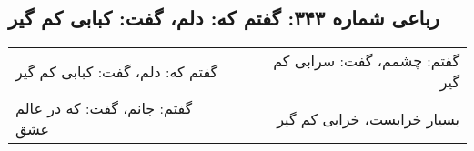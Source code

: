 \begin{center}
\section*{رباعی شماره ۳۴۳: گفتم که: دلم، گفت: کبابی کم گیر}
\label{sec:sh343}
\begin{longtable}{l p{0.5cm} r}
گفتم که: دلم، گفت: کبابی کم گیر
&&
گفتم: چشمم، گفت: سرابی کم گیر
\\
گفتم: جانم، گفت: که در عالم عشق
&&
بسیار خرابست، خرابی کم گیر
\\
\end{longtable}
\end{center}
